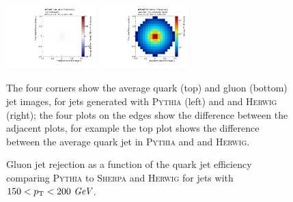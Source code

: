 \begin{figure}[htpb]
\begin{center}
  \includegraphics[width=0.31\textwidth]{figures/CNN/diff_truthg_pythiaherwig.pdf}
  \includegraphics[width=0.31\textwidth]{figures/CNN/gluon_truth_herwig.pdf}
\caption{
The four corners show the average quark (top) and gluon (bottom) jet images, for jets generated with \textsc{Pythia} (left) and
and \textsc{Herwig} (right); the four plots on the edges show the difference between the adjacent plots,
for example the top plot shows the difference between the average quark jet in \textsc{Pythia} and
and \textsc{Herwig}.}
\label{fig:cnn-avg:CNN}
\end{center}
\end{figure}


\begin{figure}[htpb]
\begin{center}
\caption{Gluon jet rejection as a function of the quark jet efficiency comparing \textsc{Pythia} to \protect{} \textsc{Sherpa}
and \protect{} \textsc{Herwig} for jets with $150<p_{{\rm T}}<200~\textit{GeV}$.}
\label{fig:cnn-pythiasherpa}
\end{center}
\end{figure}



